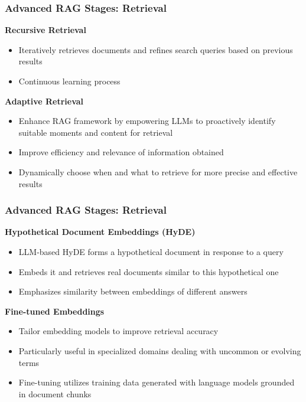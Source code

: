 \begin{frame}[fragile]\frametitle{Advanced RAG Stages: Retrieval}
\textbf{Recursive Retrieval}
  \begin{itemize}
    \item Iteratively retrieves documents and refines search queries based on previous results
    \item Continuous learning process
  \end{itemize}
\textbf{Adaptive Retrieval}
  \begin{itemize}
    \item Enhance RAG framework by empowering LLMs to proactively identify suitable moments and content for retrieval
    \item Improve efficiency and relevance of information obtained
    \item Dynamically choose when and what to retrieve for more precise and effective results
  \end{itemize}
\end{frame}

\begin{frame}[fragile]\frametitle{Advanced RAG Stages: Retrieval}
\textbf{Hypothetical Document Embeddings (HyDE)}
  \begin{itemize}
    \item LLM-based HyDE forms a hypothetical document in response to a query
    \item Embeds it and retrieves real documents similar to this hypothetical one
    \item Emphasizes similarity between embeddings of different answers
  \end{itemize}
\textbf{Fine-tuned Embeddings}
  \begin{itemize}
    \item Tailor embedding models to improve retrieval accuracy
    \item Particularly useful in specialized domains dealing with uncommon or evolving terms
    \item Fine-tuning utilizes training data generated with language models grounded in document chunks
  \end{itemize}
\end{frame}


